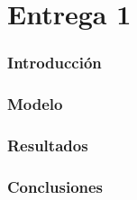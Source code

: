 \part{Entrega 1}

\section{Introducción}

\section{Modelo}

\section{Resultados}

\section{Conclusiones}
